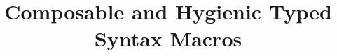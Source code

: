 \documentclass{sig-alternate}
\begin{document}
\newtheorem{theorem}{Theorem}
\newtheorem{lemma}{Lemma}
\newtheorem{definition}{Definition}
\newtheorem{property}{Property}
%

\title{Composable and Hygienic Typed Syntax Macros}
%
%
%
%
%

%
\author{
%
%
}
\end{document}
